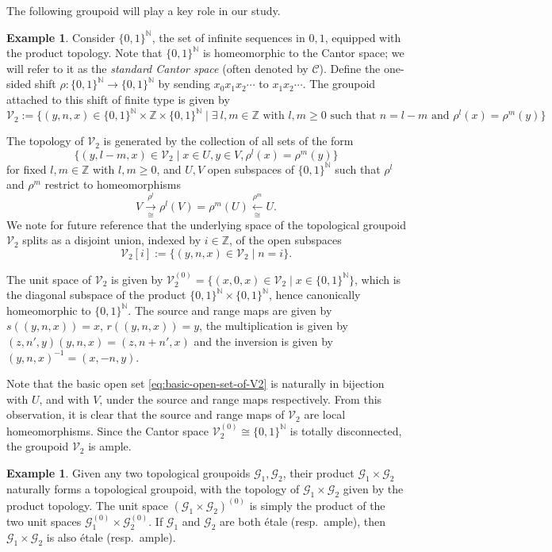 \documentclass[10pt,a4paper]{amsart}
\numberwithin{equation}{section}
\numberwithin{figure}{section}
\theoremstyle{definition}
\newtheorem{ex}[thm]{Example}
\newcommand{\cC}{\mathcal{C}}
\newcommand{\cG}{\mathcal{G}}
\newcommand{\cV}{\mathcal{V}}
\newcommand{\bN}{\mathbb{N}}
\newcommand{\bZ}{\mathbb{Z}}
\renewcommand{\geq}{\geqslant}
\begin{document}
The following groupoid will play a key role in our study.

\begin{ex}
\label{ex:SFT}
Consider $\{0,1\}^{\bN}$, the set of infinite sequences in $0,1$, equipped with the product topology. Note that $\{0,1\}^{\bN}$ is homeomorphic to the Cantor space; we will refer to it as the \emph{standard Cantor space} (often denoted by $\cC$). Define the one-sided shift $\rho \colon \{0,1\}^{\bN} \to \{0,1\}^{\bN}$ by sending $x_0x_1x_2\cdots$ to $x_1x_2\cdots$. The groupoid attached to this shift of finite type is given by 
\[
\cV_2 := \{ (y,n,x) \in \{0,1\}^{\bN} \times \bZ \times \{0,1\}^{\bN} \mid \exists~ l,m \in \bZ \text{ with } l,m\geq 0 \text{ such that } n=l-m \text{ and } \rho^l(x) = \rho^m(y) \}
\]

The topology of $\cV_2$ is generated by the collection of all sets of the form
\begin{equation}
\label{eq:basic-open-set-of-V2}
\{ (y,l-m,x)\in \cV_2 \mid x\in U, y\in V, \rho^l(x) = \rho^m(y)\}
\end{equation}
for fixed $l,m\in \bZ$ with $l,m\geq 0$, and $U,V$ open subspaces of $\{0,1\}^{\bN}$ such that $\rho^l$ and $\rho^m$ restrict to homeomorphisms
\[
V \xrightarrow[\;\cong\;]{\rho^l} \rho^l(V) = \rho^m(U) \xleftarrow[\;\cong\;]{\rho^m} U.
\]
We note for future reference that the underlying space of the topological groupoid $\cV_2$ splits as a disjoint union, indexed by $i \in \bZ$, of the open subspaces
\[
\cV_2[i] := \{ (y,n,x) \in \cV_2 \mid n=i \}.
\]

The unit space of $\cV_2$ is given by $\cV_2^{(0)} = \{(x,0,x) \in \cV_2 \mid x \in \{0,1\}^{\bN}\}$, which is the diagonal subspace of the product $\{0,1\}^{\bN} \times \{0,1\}^{\bN}$, hence canonically homeomorphic to $\{0,1\}^{\bN}$. The source and range maps are given by $s((y,n,x)) = x$, $r((y,n,x)) = y$, the multiplication is given by $(z,n',y)(y,n,x) = (z,n+n',x)$ and the inversion is given by $(y,n,x)^{-1} = (x,-n,y)$.

Note that the basic open set \eqref{eq:basic-open-set-of-V2} is naturally in bijection with $U$, and with $V$, under the source and range maps respectively. From this observation, it is clear that the source and range maps of $\cV_2$ are local homeomorphisms. Since the Cantor space $\cV_2^{(0)} \cong \{0,1\}^\bN$ is totally disconnected, the groupoid $\cV_2$ is ample.
\end{ex}

\begin{ex}
\label{ex:product}
Given any two topological groupoids $\cG_1,\cG_2$, their product $\cG_1\times \cG_2$ naturally forms a topological groupoid, with the topology of $\cG_1\times \cG_2$ given by the product topology. The unit space $(\cG_1\times \cG_2)^{(0)}$ is simply the product of the two unit spaces $\cG_1 ^{(0)}\times \cG_2^{(0)}$. If $\cG_1$ and $\cG_2$ are both étale (resp.\ ample), then $\cG_1\times \cG_2$ is also étale (resp.\ ample).
\end{ex}
\end{document}

